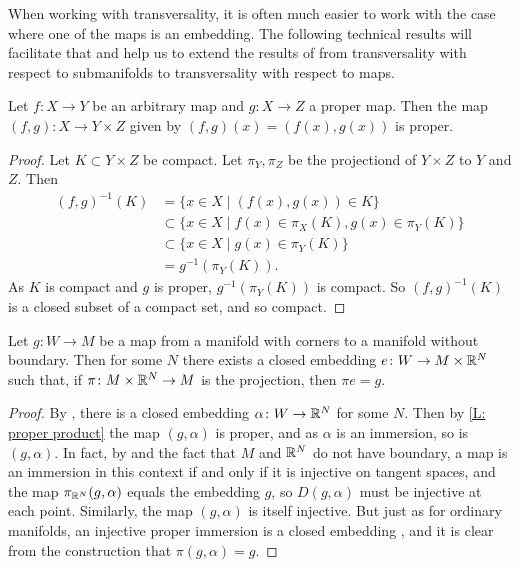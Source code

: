 When working with transversality, it is often much easier to work with the case where one of the maps is an embedding. 
The following technical results will facilitate that and help us to extend the results of \cite{GuPo74} from transversality with respect to submanifolds to transversality with respect to maps.




\begin{lemma}\label{L: proper product}
	Let $f \colon X \to Y$ be an arbitrary map and $g \colon X \to Z$ a proper map. 
	Then the map $(f,g) \colon X \to Y \times Z$ given by $(f,g)(x)=(f(x),g(x))$ is proper.
\end{lemma}
\begin{proof}
	Let $K \subset Y \times Z$ be compact. 
	Let $\pi_Y,\pi_Z$ be the projectiond of $Y \times Z$ to $Y$ and $Z$. Then 
	\begin{align*}
		(f,g)^{-1}(K) &= \{x \in X \mid (f(x),g(x)) \in K \}\\
		&\subset \{ x \in X \mid f(x) \in \pi_X(K), g(x) \in \pi_Y(K)\}\\
		&\subset \{ x \in X \mid g(x) \in \pi_Y(K)\}\\
		&= g^{-1}(\pi_Y(K)).
	\end{align*} 
	As $K$ is compact and $g$ is proper, $g^{-1}(\pi_Y(K))$ is compact. 
	So $(f,g)^{-1}(K)$ is a closed subset of a compact set, and so compact.
\end{proof}

\begin{corollary}\label{C: embed V}
Let $g \colon W \to M$ be a map from a manifold with corners to a manifold without boundary. 
Then for some $N$ there exists a closed embedding $e \colon W \to M \times \mathbb{R}^N$ such that, if $\pi \colon M \times \mathbb{R}^N \to M$ is the projection, then $\pi e = g$. 
\end{corollary}
\begin{proof}
By \cite[Corollary 11.3.10]{MaDo92}, there is a closed embedding $\alpha \colon W \to \mathbb{R}^N$ for some $N$. 
Then by \cref{L: proper product} the map $(g,\alpha)$ is proper, and as $\alpha$ is an immersion, so is $(g,\alpha)$.
In fact, by \cite[Theorem 3.2.6]{MaDo92} and the fact that $M$ and $\mathbb{R}^N$ do not have boundary, a map is an immersion in this context if and only if it is injective on tangent spaces, and the map $\pi_{\mathbb{R}^N}(g,\alpha)$ equals the embedding $g$, so $D(g,\alpha)$ must be injective at each point.
Similarly, the map $(g,\alpha)$ is itself  injective.  
But just as for ordinary manifolds, an injective proper immersion is a closed embedding \cite[Proposition 3.3.4]{MaDo92}, and it is clear from the construction that $\pi (g,\alpha) = g$.
\end{proof}



